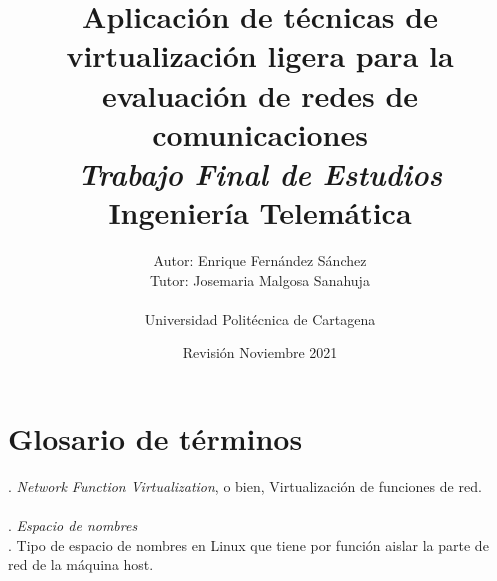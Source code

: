 \documentclass[12pt]{article}
\begin{document}
	
	\title{\textbf{Aplicación de técnicas de virtualización ligera para la evaluación de redes de comunicaciones} \\ 
	\addvspace{10px} \large \textit{Trabajo Final de Estudios} \\
	\large Ingeniería Telemática}
	\author{Autor: Enrique Fernández Sánchez \\ Tutor: Josemaria Malgosa Sanahuja \\ \\Universidad Politécnica de Cartagena}
	
	\date{Revisión Noviembre 2021}
	
	\maketitle
	
	
	\pagebreak
	
	\tableofcontents
	
	\pagebreak
	
	\listoffigures
	\listoftables
	\lstlistoflistings
	
	\pagebreak
	
	\pagebreak
	\section*{Glosario de términos}
	
	. \textit{Network Function Virtualization}, o bien, Virtualización de funciones de red.\\
		 
	\\
		 
	. \textit{Espacio de nombres}\\
		 
	. Tipo de espacio de nombres en Linux que tiene por función aislar la parte de red de la máquina host.\\
	
\end{document}
